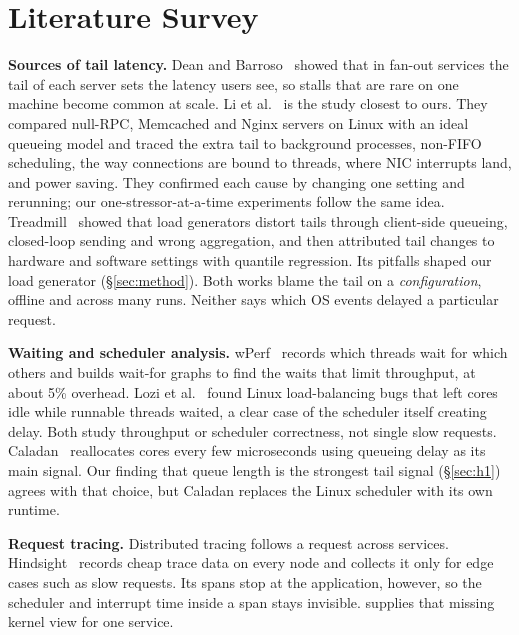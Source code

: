 \section{Literature Survey}
\label{sec:related}

\textbf{Sources of tail latency.} Dean and Barroso~\cite{dean2013tail}
showed that in fan-out services the tail of each server sets the latency
users see, so stalls that are rare on one machine become common at scale.
Li et al.~\cite{li2014tales} is the study closest to ours. They compared
null-RPC, Memcached and Nginx servers on Linux with an ideal queueing model
and traced the extra tail to background processes, non-FIFO scheduling, the
way connections are bound to threads, where NIC interrupts land, and power
saving. They confirmed each cause by changing one setting and rerunning;
our one-stressor-at-a-time experiments follow the same idea.
Treadmill~\cite{zhang2016treadmill} showed that load generators distort
tails through client-side queueing, closed-loop sending and wrong
aggregation, and then attributed tail changes to hardware and software
settings with quantile regression. Its pitfalls shaped our load generator
(\S\ref{sec:method}). Both works blame the tail on a \emph{configuration},
offline and across many runs. Neither says which OS events delayed a
particular request.

\textbf{Waiting and scheduler analysis.} wPerf~\cite{zhou2018wperf} records
which threads wait for which others and builds wait-for graphs to find the
waits that limit throughput, at about 5\% overhead. Lozi et
al.~\cite{lozi2016wasted} found Linux load-balancing bugs that left cores
idle while runnable threads waited, a clear case of the scheduler itself
creating delay. Both study throughput or scheduler correctness, not single
slow requests. Caladan~\cite{fried2020caladan} reallocates cores every few
microseconds using queueing delay as its main signal. Our finding that
queue length is the strongest tail signal (\S\ref{sec:h1}) agrees with that
choice, but Caladan replaces the Linux scheduler with its own runtime.

\textbf{Request tracing.} Distributed tracing follows a request across
services. Hindsight~\cite{zhang2023hindsight} records cheap trace data on
every node and collects it only for edge cases such as slow requests. Its
spans stop at the application, however, so the scheduler and interrupt
time inside a span stays invisible. \sys{} supplies that missing kernel
view for one service.

